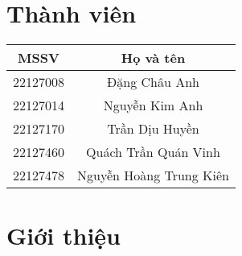 \documentclass[a4paper]{report}
\begin{document}
\newpage
\section{Thành viên}
\begin{table}[h]
    \centering
    \begin{tabular}{|c|c|}
        \hline
        MSSV & Họ và tên \\ \hline
        22127008 & Đặng Châu Anh \\ \hline
        22127014 & Nguyễn Kim Anh \\ \hline
        22127170 & Trần Dịu Huyền \\ \hline
        22127460 & Quách Trần Quán Vinh \\ \hline
        22127478 & Nguyễn Hoàng Trung Kiên \\ \hline
    \end{tabular}
    \label{tab:danh_sach_sinh_vien}
\end{table}

\section{Giới thiệu}
\end{document}
